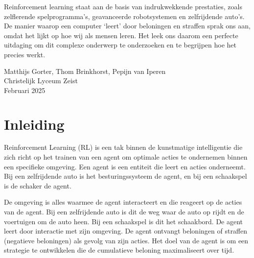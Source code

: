 \documentclass[a4paper,10pt]{report}
\begin{document}
Reinforcement learning staat aan de basis van indrukwekkende prestaties, zoals
zelflerende spelprogramma’s, geavanceerde robotsystemen en zelfrijdende auto’s.
De manier waarop een computer ‘leert’ door beloningen en straffen sprak ons
aan, omdat het lijkt op hoe wij als mensen leren. Het leek ons daarom een
perfecte uitdaging om dit complexe onderwerp te onderzoeken en te begrijpen hoe
het precies werkt.

Matthijs Gorter, Thom Brinkhorst, Pepijn van Iperen \\ Christelijk Lyceum Zeist
\\ Februari 2025

\tableofcontents
\newpage
{}  %

\newpage

\chapter{Inleiding}
Reinforcement Learning (RL) is een tak binnen de kunstmatige intelligentie die
zich richt op het trainen van een agent om optimale acties te ondernemen binnen
een specifieke omgeving. Een agent is een entiteit die leert en acties
onderneemt. Bij een zelfrijdende auto is het besturingssysteem de agent, en bij
een schaakspel is de schaker de agent.

\noindent
\begin{minipage}[t]{0.65\textwidth}
    \vspace{-6.5\baselineskip}
    De omgeving is alles waarmee de agent interacteert en die reageert op de acties van
    de agent. Bij een zelfrijdende auto is dit de weg waar de auto op rijdt en de
    voertuigen om de auto heen. Bij een schaakspel is dit het schaakbord. De agent
    leert door interactie met zijn omgeving. De agent ontvangt beloningen of
    straffen (negatieve beloningen) als gevolg van zijn acties. Het doel van de
    agent is om een strategie te ontwikkelen die de cumulatieve beloning
    maximaliseert over tijd.
\end{minipage}
\hfill %
\begin{minipage}[t]{0.3\textwidth} %
    \centering
    \label{fig:rl_model}
\end{minipage}
\end{document}

